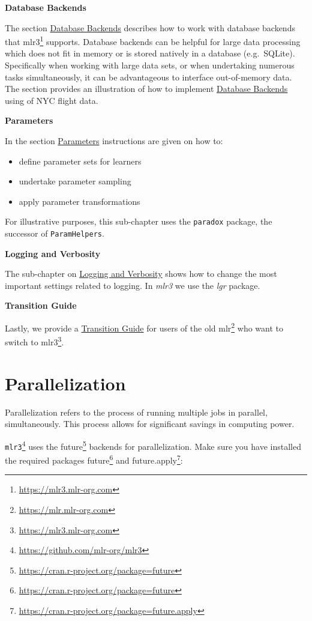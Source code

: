 \documentclass[12pt,]{scrbook}
\providecommand{\tightlist}{%
  \setlength{\itemsep}{0pt}\setlength{\parskip}{0pt}}
\renewcommand{\href}[2]{#2\footnote{\url{#1}}}
\begin{document}
\textbf{Database Backends}

The section \protect\hyperlink{backends}{Database Backends} describes how to work with database backends that \href{https://mlr3.mlr-org.com}{mlr3} supports.
Database backends can be helpful for large data processing which does not fit in memory or is stored natively in a database (e.g.~SQLite).
Specifically when working with large data sets, or when undertaking numerous tasks simultaneously, it can be advantageous to interface out-of-memory data.
The section provides an illustration of how to implement \protect\hyperlink{backends}{Database Backends} using of NYC flight data.

\textbf{Parameters}

In the section \protect\hyperlink{paradox}{Parameters} instructions are given on how to:

\begin{itemize}
\tightlist
\item
  define parameter sets for learners
\item
  undertake parameter sampling
\item
  apply parameter transformations
\end{itemize}

For illustrative purposes, this sub-chapter uses the \texttt{paradox} package, the successor of \texttt{ParamHelpers}.

\textbf{Logging and Verbosity}

The sub-chapter on \protect\hyperlink{logging}{Logging and Verbosity} shows how to change the most important settings related to logging.
In \emph{mlr3} we use the \emph{lgr} package.

\textbf{Transition Guide}

Lastly, we provide a \protect\hyperlink{transition}{Transition Guide} for users of the old \href{https://mlr.mlr-org.com}{mlr} who want to switch to \href{https://mlr3.mlr-org.com}{mlr3}.

\hypertarget{parallelization}{%
\section{Parallelization}\label{parallelization}}

Parallelization refers to the process of running multiple jobs in parallel, simultaneously.
This process allows for significant savings in computing power.

\href{https://github.com/mlr-org/mlr3}{\texttt{mlr3}} uses the \href{https://cran.r-project.org/package=future}{future} backends for parallelization.
Make sure you have installed the required packages \href{https://cran.r-project.org/package=future}{future} and \href{https://cran.r-project.org/package=future.apply}{future.apply}:
\end{document}
